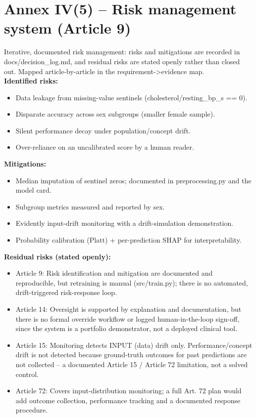 \documentclass[11pt,a4paper]{article}
\begin{document}
\section*{Annex IV(5) -- Risk management system (Article 9)}
Iterative, documented risk management: risks and mitigations are recorded in docs/decision\_log.md, and residual risks are stated openly rather than closed out. Mapped article-by-article in the requirement->evidence map.\\[4pt]
\textbf{Identified risks:}
\begin{itemize}[leftmargin=1.4em,topsep=1pt]
\item Data leakage from missing-value sentinels (cholesterol/resting\_bp\_s == 0).
\item Disparate accuracy across sex subgroups (smaller female sample).
\item Silent performance decay under population/concept drift.
\item Over-reliance on an uncalibrated score by a human reader.
\end{itemize}
\textbf{Mitigations:}
\begin{itemize}[leftmargin=1.4em,topsep=1pt]
\item Median imputation of sentinel zeros; documented in preprocessing.py and the model card.
\item Subgroup metrics measured and reported by sex.
\item Evidently input-drift monitoring with a drift-simulation demonstration.
\item Probability calibration (Platt) + per-prediction SHAP for interpretability.
\end{itemize}
\textbf{Residual risks (stated openly):}
\begin{itemize}[leftmargin=1.4em,topsep=1pt]
\item Article 9: Risk identification and mitigation are documented and reproducible, but retraining is manual (src/train.py); there is no automated, drift-triggered risk-response loop.
\item Article 14: Oversight is supported by explanation and documentation, but there is no formal override workflow or logged human-in-the-loop sign-off, since the system is a portfolio demonstrator, not a deployed clinical tool.
\item Article 15: Monitoring detects INPUT (data) drift only. Performance/concept drift is not detected because ground-truth outcomes for past predictions are not collected -- a documented Article 15 / Article 72 limitation, not a solved control.
\item Article 72: Covers input-distribution monitoring; a full Art. 72 plan would add outcome collection, performance tracking and a documented response procedure.
\end{itemize}
\end{document}
